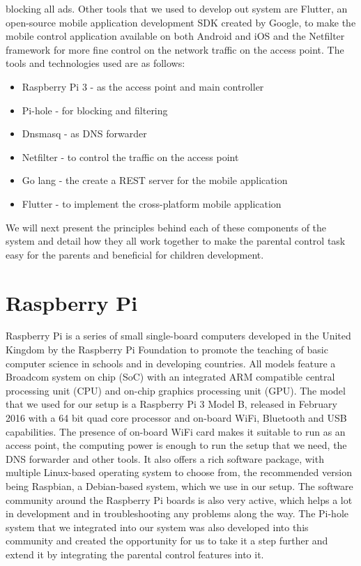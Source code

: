 blocking all ads. Other tools that we used to develop out system are Flutter, an open-source mobile application development SDK created by Google, to make the mobile control application available on both Android and iOS and the Netfilter framework for more fine control on the network traffic on the access point. The tools and technologies used are as follows:

\begin{itemize}
\item Raspberry Pi 3 - as the access point and main controller
\item Pi-hole - for blocking and filtering
\item Dnsmasq - as DNS forwarder
\item Netfilter - to control the traffic on the access point
\item Go lang - the create a REST server for the mobile application
\item Flutter - to implement the cross-platform mobile application
\end{itemize}

We will next present the principles behind each of these components of the system and detail how they all work together to make the parental control task easy for the parents and beneficial for children development.

\section{Raspberry Pi}

Raspberry Pi is a series of small single-board computers developed in the United Kingdom by the Raspberry Pi Foundation to promote the teaching of basic computer science in schools and in developing countries. \parencite{raspberryPi} All models feature a Broadcom system on chip (SoC) with an integrated ARM compatible central processing unit (CPU) and on-chip graphics processing unit (GPU). The model that we used for our setup is a Raspberry Pi 3 Model B, released in February 2016 with a 64 bit quad core processor and on-board WiFi, Bluetooth and USB capabilities. The presence of on-board WiFi card makes it suitable to run as an access point, the computing power is enough to run the setup that we need, the DNS forwarder and other tools. It also offers a rich software package, with multiple Linux-based operating system to choose from, the recommended version being Raspbian, a Debian-based system, which we use in our setup. The software community around the Raspberry Pi boards is also very active, which helps a lot in development and in troubleshooting any problems along the way. The Pi-hole system that we integrated into our system was also developed into this community and created the opportunity for us to take it a step further and extend it by integrating the parental control features into it.

